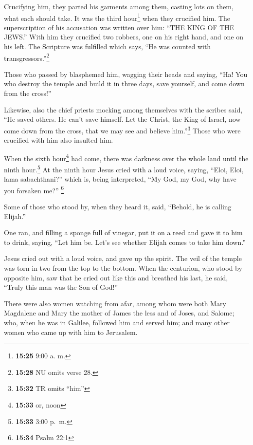  Crucifying him, they parted his garments among them,
casting lots on them, what each should take.  It was the
third hour\footnote{\textbf{15:25} 9:00 a. m.} when they crucified him.
 The superscription of his accusation was written over
him: ``THE KING OF THE JEWS.''  With him they crucified
two robbers, one on his right hand, and one on his left. 
The Scripture was fulfilled which says, ``He was counted with
transgressors.''\footnote{\textbf{15:28} NU omits verse 28.}

 Those who passed by blasphemed him, wagging their heads
and saying, ``Ha! You who destroy the temple and build it in three days,
 save yourself, and come down from the cross!''

 Likewise, also the chief priests mocking among
themselves with the scribes said, ``He saved others. He can't save
himself.  Let the Christ, the King of Israel, now come
down from the cross, that we may see and believe him.''\footnote{\textbf{15:32}
  TR omits ``him''} Those who were crucified with him also insulted him.

 When the sixth hour\footnote{\textbf{15:33} or, noon}
had come, there was darkness over the whole land until the ninth
hour.\footnote{\textbf{15:33} 3:00 p.~m.}  At the ninth
hour Jesus cried with a loud voice, saying, ``Eloi, Eloi, lama
sabachthani?'' which is, being interpreted, ``My God, my God, why have
you forsaken me?'' \footnote{\textbf{15:34} Psalm 22:1}

 Some of those who stood by, when they heard it, said,
``Behold, he is calling Elijah.''

 One ran, and filling a sponge full of vinegar, put it on
a reed and gave it to him to drink, saying, ``Let him be. Let's see
whether Elijah comes to take him down.''

 Jesus cried out with a loud voice, and gave up the
spirit.  The veil of the temple was torn in two from the
top to the bottom.  When the centurion, who stood by
opposite him, saw that he cried out like this and breathed his last, he
said, ``Truly this man was the Son of God!''

 There were also women watching from afar, among whom
were both Mary Magdalene and Mary the mother of James the less and of
Joses, and Salome;  who, when he was in Galilee, followed
him and served him; and many other women who came up with him to
Jerusalem.

